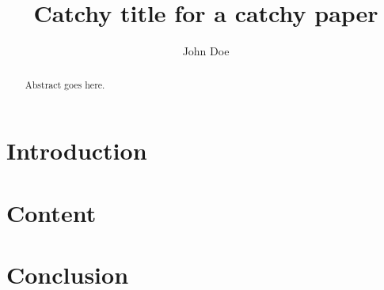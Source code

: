 \documentclass[a4paper,twocolumn]{article}
\begin{document}
\title{Catchy title for a catchy paper}

\author{John Doe}

\maketitle

\begin{abstract}
    Abstract goes here. 
\end{abstract}



\section{Introduction}
\label{sec:intro}

\section{Content}
\label{sec:content}

\section{Conclusion}
\label{sec:conclusion}


\end{document}
